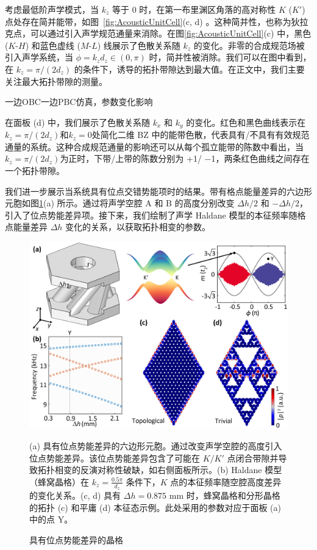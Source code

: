 考虑最低阶声学模式，当 $k_z$ 等于 $0$ 时，在第一布里渊区角落的高对称性 $K$ ($K'$) 点处存在简并能带，如图~\ref{fig:AcousticUnitCell}(c, d) 。这种简并性，也称为狄拉克点，可以通过引入声学规范通量来消除。在图\ref{fig:AcousticUnitCell}(c) 中，黑色 ($K$-$H$) 和蓝色虚线 ($M$-$L$) 线展示了色散关系随 $k_z$ 的变化。非零的合成规范场被引入声学系统，当 $\phi = k_z d_z \in (0, \pi)$ 时，简并性被消除。我们可以在图中看到，在 $k_z = \pi/(2d_z)$ 的条件下，诱导的拓扑带隙达到最大值。在正文中，我们主要关注最大拓扑带隙的测量。

{\color{red}一边OBC一边PBC仿真，参数变化影响}

在面板 (d) 中，我们展示了色散关系随 $k_x$ 和 $k_y$ 的变化。红色和黑色曲线表示在$k_z=\pi/(2d_z)$和$k_z=0$处简化二维 BZ 中的能带色散，代表具有/不具有有效规范通量的系统。这种合成规范通量的影响还可以从每个孤立能带的陈数中看出，当$k_z=\pi/(2d_z)$为正时，下带/上带的陈数分别为 +1/ −1，两条红色曲线之间存在一个拓扑带隙。

我们进一步展示当系统具有位点交错势能项时的结果。带有格点能量差异的六边形元胞如图\ref{fig:ComsolMass}(a) 所示。通过将声学空腔 A 和 B 的高度分别改变 $\Delta h/2$ 和 $-\Delta h/2$，引入了位点势能差异项。接下来，我们绘制了声学 Haldane 模型的本征频率随格点能量差异 $\Delta h$ 变化的关系，以获取拓扑相变的参数。

\begin{figure}[htbp]
    \centering
    \includegraphics[width=0.75\linewidth]{figure/FracHaldExp/ComsolMass.png}
    \caption{具有位点势能差异的晶格}(a) 具有位点势能差异的六边形元胞。通过改变声学空腔的高度引入位点势能差异。该位点势能差异包含了可能在 $K/K'$ 点闭合带隙并导致拓扑相变的反演对称性破缺，如右侧面板所示。(b) Haldane 模型（蜂窝晶格）在 $k_z = \frac{0.5\pi}{d_z}$ 条件下，$K$ 点的本征频率随空腔高度差异的变化关系。(c, d) 具有 $\Delta h = 0.875$ mm 时，蜂窝晶格和分形晶格的拓扑 (c) 和平庸 (d) 本征态示例。此处采用的参数对应于面板 (a) 中的点 Y。
    \label{fig:ComsolMass}
\end{figure}

